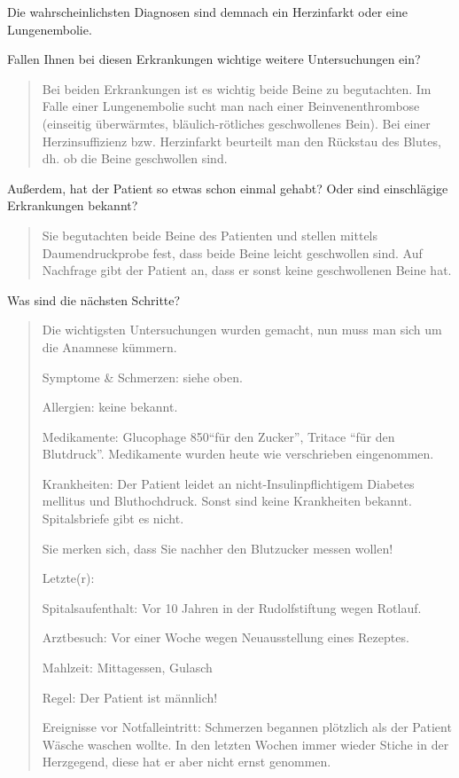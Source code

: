 Die wahrscheinlichsten Diagnosen sind demnach ein
Herzinfarkt oder eine Lungenembolie.

\noindent Fallen Ihnen bei diesen Erkrankungen wichtige
weitere Untersuchungen ein?

\begin{quote}
  Bei beiden Erkrankungen ist es
  wichtig beide Beine zu begutachten. Im Falle einer Lungenembolie sucht man nach
  einer Beinvenenthrombose (einseitig überwärmtes, bläulich-rötliches geschwollenes
  Bein). Bei einer Herzinsuffizienz bzw. Herzinfarkt beurteilt man den Rückstau des
  Blutes, dh. ob die Beine geschwollen sind.
\end{quote}


\noindent Außerdem, hat der Patient so etwas schon einmal
gehabt? Oder sind einschlägige Erkrankungen bekannt?  

\begin{quote}
  Sie begutachten beide Beine des Patienten und stellen mittels
  Daumendruckprobe fest, dass beide Beine leicht geschwollen sind. Auf
  Nachfrage gibt der Patient an, dass er sonst keine geschwollenen Beine
  hat.
\end{quote}

\noindent Was sind die nächsten Schritte?

\begin{quote}
  Die wichtigsten Untersuchungen wurden gemacht, nun muss man sich um die
  Anamnese kümmern.
  
  Symptome \& Schmerzen: siehe oben.
  
  Allergien: keine bekannt.
  
  Medikamente: Glucophage 850\Mg* \enquote{für den Zucker},
  Tritace \enquote{für den Blutdruck}. Medikamente wurden heute wie verschrieben eingenommen.
  
  Krankheiten: Der Patient leidet an nicht-Insulinpflichtigem Diabetes
  mellitus und Bluthochdruck. Sonst sind keine Krankheiten bekannt.
  Spitalsbriefe gibt es nicht.
  
  Sie merken sich, dass Sie nachher den Blutzucker messen wollen!
  
  Letzte(r):
  
  Spitalsaufenthalt: Vor 10 Jahren in der Rudolfstiftung wegen Rotlauf.
  
  Arztbesuch: Vor einer Woche wegen Neuausstellung eines Rezeptes.
  
  Mahlzeit: Mittagessen, Gulasch
  
  Regel: Der Patient ist männlich!
  
  Ereignisse vor Notfalleintritt: Schmerzen begannen plötzlich als der
  Patient Wäsche waschen wollte. In den letzten Wochen immer wieder
  Stiche in der Herzgegend, diese hat er aber nicht ernst genommen.
    
\end{quote}
% 

